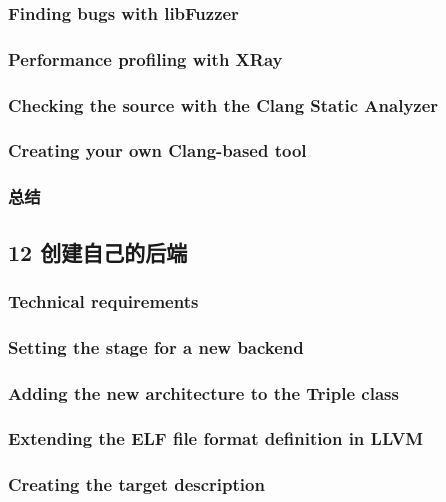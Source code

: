 \documentclass[11pt,a4paper,UTF8]{ctexart}
\begin{document}
		\subsubsection{Finding bugs with libFuzzer}
		\subsubsection{Performance profiling with XRay}
		\subsubsection{Checking the source with the Clang Static Analyzer}
		\subsubsection{Creating your own Clang-based tool}
		\subsubsection{总结}
	\subsection{12 创建自己的后端}
		\subsubsection{Technical requirements}
		\subsubsection{Setting the stage for a new backend}
		\subsubsection{Adding the new architecture to the Triple class}
		\subsubsection{Extending the ELF file format definition in LLVM}
		\subsubsection{Creating the target description}
\end{document}
